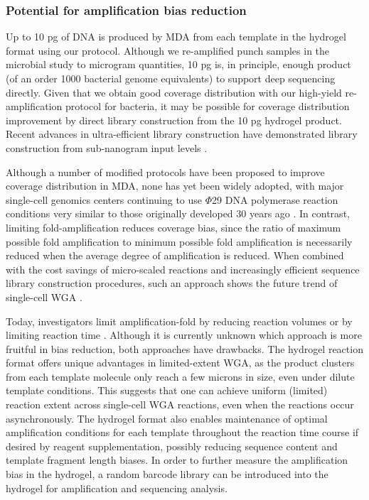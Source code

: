 \subsubsection{Potential for amplification bias reduction}
Up to 10 pg of DNA is produced by MDA from each template in the hydrogel format using our protocol. Although we re-amplified punch samples in the microbial study to microgram quantities, 10 pg is, in principle, enough product (of an order 1000 bacterial genome equivalents) to support deep sequencing directly. Given that we obtain good coverage distribution with our high-yield re-amplification protocol for bacteria, it may be possible for coverage distribution improvement by direct library construction from the 10 pg hydrogel product. Recent advances in ultra-efficient library construction have demonstrated library construction from sub-nanogram input levels \cite{White:2009jz}. 

Although a number of modified protocols have been proposed to improve coverage distribution in MDA, none has yet been widely adopted, with major single-cell genomics centers continuing to use $\Phi$29 DNA polymerase reaction conditions very similar to those originally developed 30 years ago \cite{Blanco:1985ul,Allen:2011jn}. In contrast, limiting fold-amplification reduces coverage bias, since the ratio of maximum possible fold amplification to minimum possible fold amplification is necessarily reduced when the average degree of amplification is reduced. When combined with the cost savings of micro-scaled reactions and increasingly efficient sequence library construction procedures, such an approach shows the future trend of single-cell WGA \cite{deBourcy:2014ji}. 

Today, investigators limit amplification-fold by reducing reaction volumes \cite{Landry:2013dh,Marcy:2007ip} or by limiting reaction time \cite{Spits:2006em}. Although it is currently unknown which approach is more fruitful in bias reduction, both approaches have drawbacks. The hydrogel reaction format offers unique advantages in limited-extent WGA, as the product clusters from each template molecule only reach a few microns in size, even under dilute template conditions. This suggests that one can achieve uniform (limited) reaction extent across single-cell WGA reactions, even when the reactions occur asynchronously. The hydrogel format also enables maintenance of optimal amplification conditions for each template throughout the reaction time course if desired by reagent supplementation, possibly reducing sequence content and template fragment length biases. In order to further measure the amplification bias in the hydrogel, a random barcode library can be introduced into the hydrogel for amplification and sequencing analysis. 

